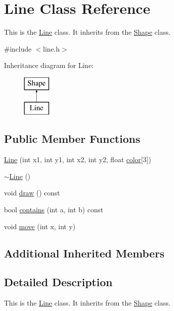 \hypertarget{classLine}{\section{Line Class Reference}
\label{classLine}
}


This is the \hyperlink{classLine}{Line} class. It inherits from the \hyperlink{classShape}{Shape} class.  




{\ttfamily \#include $<$line.\-h$>$}

Inheritance diagram for Line\-:\begin{figure}[H]
\begin{center}
\leavevmode
\includegraphics[height=2.000000cm]{classLine}
\end{center}
\end{figure}
\subsection*{Public Member Functions}
\begin{DoxyCompactItemize}
\item 
\hyperlink{classLine_afc1bfd0f0c5c94e78f7a157fdecae905}{Line} (int x1, int y1, int x2, int y2, float \hyperlink{classShape_a9f925188936af909e796807fc75c1501}{color}\mbox{[}3\mbox{]})
\item 
\hyperlink{classLine_aabe85f48d22d92b62257091f48174fac}{$\sim$\-Line} ()
\item 
void \hyperlink{classLine_ac54adb686a64dd9bd1701207a6cf2a83}{draw} () const 
\item 
bool \hyperlink{classLine_a0c1073cc62a7dc78b7f49bc776f40b40}{contains} (int a, int b) const 
\item 
void \hyperlink{classLine_a1dac74ba3a1c1770079dae9901e05af2}{move} (int x, int y)
\end{DoxyCompactItemize}
\subsection*{Additional Inherited Members}


\subsection{Detailed Description}
This is the \hyperlink{classLine}{Line} class. It inherits from the \hyperlink{classShape}{Shape} class. 

